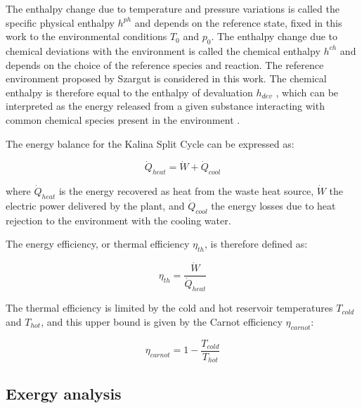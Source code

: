\documentclass[final,times,5p]{elsarticle}
\begin{document}
	
	The enthalpy change due to temperature and pressure variations is called the specific physical enthalpy $h^{ph}$ and depends on the reference state, fixed in this work to the environmental conditions $T_0$ and $p_0$. The enthalpy change due to chemical deviations with the environment is called the chemical enthalpy $h^{ch}$ and depends on the choice of the reference species and reaction. The reference environment proposed by Szargut is considered in this work. The chemical enthalpy is therefore equal to the enthalpy of devaluation $h_{dev}$ \cite{Kotas1995}, which can be interpreted as the energy released from a given substance interacting with common chemical species present in the environment \cite{Szargut1988}. 
	

	The energy balance for the Kalina Split Cycle can be expressed as: 

	\begin{equation}
	 \dot{Q}_{heat}=\dot{W}+\dot{Q}_{cool}
	\end{equation}	

	where $\dot{Q}_{heat}$ is the energy recovered as heat from the waste heat source, $\dot{W}$ the electric power delivered by the plant, and $\dot{Q}_{cool}$ the energy losses due to heat rejection to the environment with the cooling water.
	
	The energy efficiency, or thermal efficiency $\eta_{th}$, is therefore defined as:
	
	\begin{equation}
		\eta_{th} = \frac{\dot{W}}{\dot{Q}_{heat}} 
	\end{equation}	

	The thermal efficiency is limited by the cold and hot reservoir temperatures $T_{cold}$ and $T_{hot}$, and this upper bound is given by the Carnot efficiency $\eta_{carnot}$:
	
	\begin{equation}
		\eta_{carnot} = 1-\frac{T_{cold}}{T_{hot}} 
	\end{equation}
	
	\subsection{Exergy analysis}
	\label{subsec:exergy_analysis}
\end{document}
